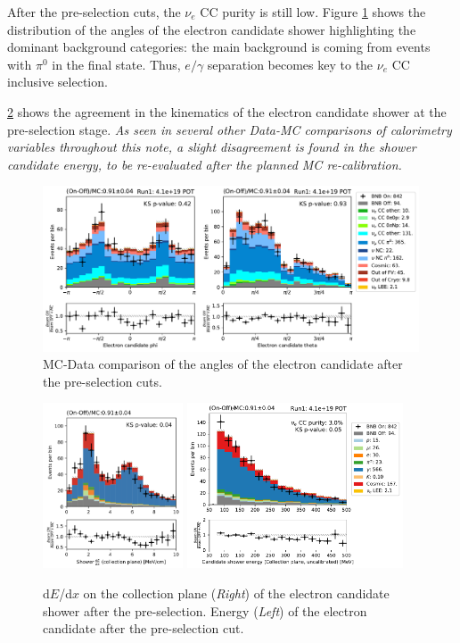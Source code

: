 After the pre-selection cuts, the $\nu_e$ CC purity is still low. Figure \ref{fig:pre_shower_E_pdg} shows the distribution of the angles of the electron candidate shower highlighting the dominant background categories: the main background is coming from events with $\pi^0$ in the final state. Thus, $e/\gamma$ separation becomes key to the $\nu_e$ CC inclusive selection.

\cref{fig:e_cand_Calo} shows the agreement in the kinematics of the electron candidate shower at the pre-selection stage. \emph{As seen in several other Data-MC comparisons of calorimetry variables throughout this note, a slight disagreement is found in the shower candidate energy, to be re-evaluated after the planned MC re-calibration.}


\begin{figure}[h]
    \centering
    \includegraphics[height=4.9cm]{NueCCsel/Images/run1/pre_angles.pdf}
    \caption{MC-Data comparison of the angles of the electron candidate after the pre-selection cuts.}
    \label{fig:pre_shower_E_pdg}
\end{figure}

\begin{figure}[h]
    \centering
    \includegraphics[height=4.9cm]{NueCCsel/Images/run1/e_cand_dedxColl}
     \includegraphics[height=4.9cm]{NueCCsel/Images/run1/pre_shower_E_pdg.pdf}
    
    \caption{d$E$/d$x$ on the collection plane (\emph{Right}) of the electron candidate shower after the pre-selection. Energy (\emph{Left}) of the electron candidate after the pre-selection cut.}
    \label{fig:e_cand_Calo}
\end{figure}


